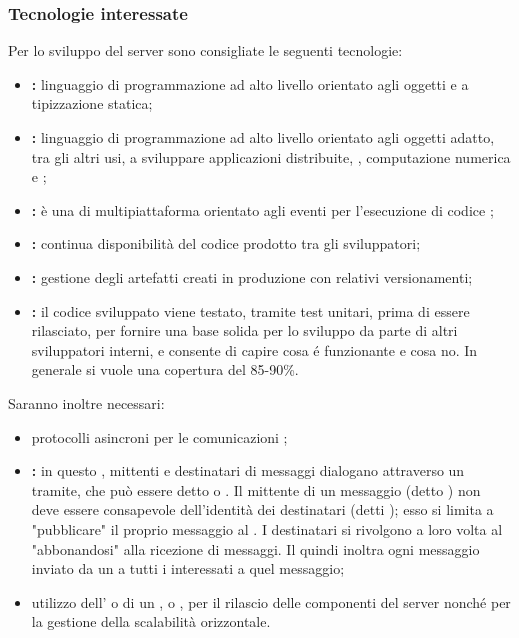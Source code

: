 	\subsubsection{Tecnologie interessate}
		Per lo sviluppo del server  sono consigliate le seguenti tecnologie:
		\begin{itemize}
			\item \textbf{:} linguaggio di programmazione ad alto livello orientato agli oggetti e a tipizzazione statica;
			\item \textbf{:} linguaggio di programmazione ad alto livello orientato agli oggetti adatto, tra gli altri usi, a sviluppare applicazioni distribuite, , computazione numerica e ;
			\item \textbf{:} è una  di   multipiattaforma orientato agli eventi per l'esecuzione di codice ;
			\item \textbf{:} continua disponibilità del codice prodotto tra gli sviluppatori;
			\item \textbf{:} gestione degli artefatti creati in produzione con relativi versionamenti;
			\item \textbf{:} il codice sviluppato viene testato, tramite test unitari, prima di essere rilasciato, per fornire una base solida per lo sviluppo da parte di altri sviluppatori interni, e consente di capire cosa é funzionante e cosa no. In generale si vuole una copertura del 85-90\%.
		\end{itemize}
		Saranno inoltre necessari:
		\begin{itemize}
			\item protocolli asincroni per le comunicazioni ;
			\item \textbf{:} in questo , mittenti e destinatari di messaggi dialogano attraverso un tramite, che può essere detto  o . Il mittente di un messaggio (detto ) non deve essere consapevole dell'identità dei destinatari (detti ); esso si limita a "pubblicare" il proprio messaggio al . I destinatari si rivolgono a loro volta al  "abbonandosi" alla ricezione di messaggi. Il  quindi inoltra ogni messaggio inviato da un  a tutti i  interessati a quel messaggio;
			\item utilizzo dell’  o di un ,  o , per il rilascio delle componenti del server nonché per la gestione della scalabilità orizzontale.
		\end{itemize}


